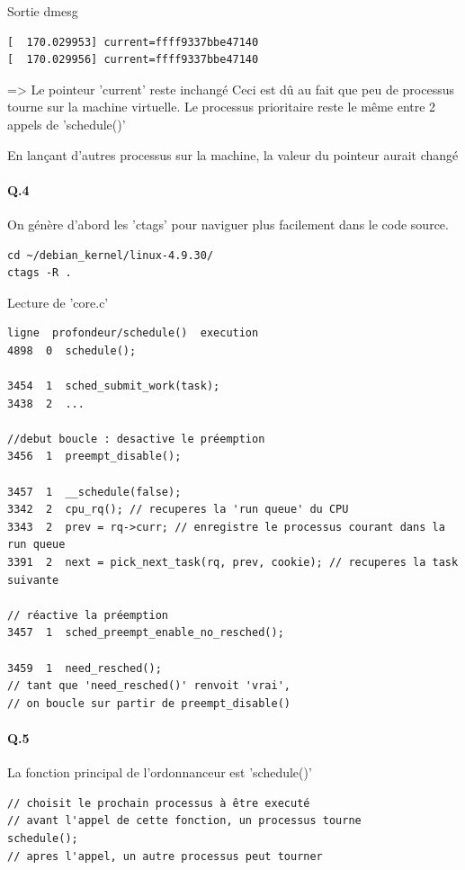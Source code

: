 \documentclass[10pt]{article}
\begin{document}
Sortie dmesg
\begin{lstlisting}[frame=single]
[  170.029953] current=ffff9337bbe47140
[  170.029956] current=ffff9337bbe47140
\end{lstlisting}

=> Le pointeur 'current' reste inchangé
Ceci est dû au fait que peu de processus tourne sur la machine virtuelle.
Le processus prioritaire reste le même entre 2 appels de 'schedule()'

En lançant d'autres processus sur la machine, la valeur du pointeur aurait changé


\paragraph{Q.4}
On génère d'abord les 'ctags' pour naviguer plus facilement dans le code source.

\lstset{language=bash}
\begin{lstlisting}[frame=single]
cd ~/debian_kernel/linux-4.9.30/
ctags -R .
\end{lstlisting}


Lecture de 'core.c'
\lstset{language=C}
\begin{lstlisting}[frame=single]
ligne  profondeur/schedule()  execution
4898  0  schedule();

3454  1  sched_submit_work(task);
3438  2  ...

//debut boucle : desactive le préemption
3456  1  preempt_disable();

3457  1  __schedule(false);
3342  2  cpu_rq(); // recuperes la 'run queue' du CPU
3343  2  prev = rq->curr; // enregistre le processus courant dans la run queue
3391  2  next = pick_next_task(rq, prev, cookie); // recuperes la task suivante

// réactive la préemption
3457  1  sched_preempt_enable_no_resched();

3459  1  need_resched();
// tant que 'need_resched()' renvoit 'vrai',
// on boucle sur partir de preempt_disable()
\end{lstlisting}
        
\paragraph{Q.5} La fonction principal de l'ordonnanceur est 'schedule()'

\lstset{language=C}
\begin{lstlisting}[frame=single]
// choisit le prochain processus à être executé
// avant l'appel de cette fonction, un processus tourne
schedule();
// apres l'appel, un autre processus peut tourner
\end{lstlisting}
        
\end{document}
